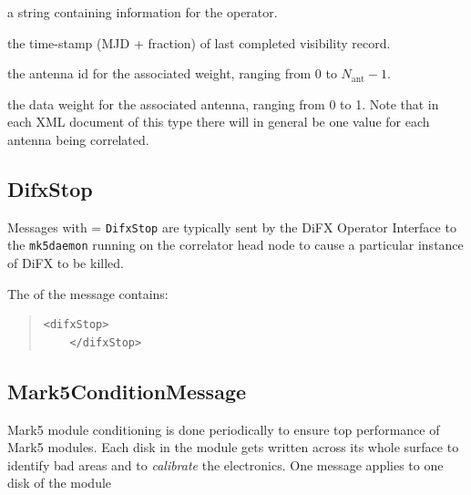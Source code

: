 \begin{description}
\begin{description}
\item{} a string containing information for the operator.
\item{} the time-stamp (MJD + fraction) of last completed visibility record.
\item{} the antenna id for the associated weight, ranging from 0 to $N_{\mathrm{ant}}-1$.
\item{} the data weight for the associated antenna, ranging from 0 to 1.
Note that in each XML document of this type there will in general be one  value for each antenna being correlated.
\end{description}








\subsection{DifxStop}

Messages with  = {\tt DifxStop} are typically sent by the DiFX Operator Interface to the {\tt mk5daemon} running on the correlator head node to cause a particular instance of DiFX to be killed.

The  of the message contains:

\begin{quotation}
\begin{Verbatim}[commandchars=\|\[\]]
    <difxStop>
    </difxStop>
\end{Verbatim}
\end{quotation}






\subsection{Mark5ConditionMessage}

Mark5 module conditioning is done periodically to ensure top performance of Mark5 modules.
Each disk in the module gets written across its whole surface to identify bad areas and to {\em calibrate} the electronics.
One message applies to one disk of the module


\end{description}
